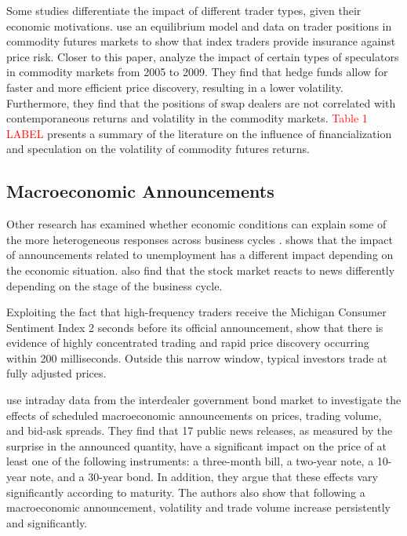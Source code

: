 \documentclass[12pt]{article}
\begin{document}
 Some studies differentiate the impact of different trader types, given their economic motivations. \citet{brunetti2014commodity}  use an equilibrium model and data on trader positions in commodity futures markets to show that index traders provide insurance against price risk.   Closer to this paper,\citet{brunetti2016speculators}  analyze the impact of certain types of speculators in commodity markets from 2005 to 2009. They find that hedge funds allow for faster and more efficient price discovery, resulting in a lower volatility. Furthermore, they find that the positions of swap dealers are not correlated with contemporaneous returns and volatility in the commodity markets.  \textcolor{red}{Table 1 LABEL} presents a summary of the literature on the influence of financialization and speculation on the volatility of commodity futures returns.

\subsection{Macroeconomic Announcements}

Other research has examined whether economic conditions can explain some of the more heterogeneous responses across business cycles \citep{boyd2005stock,andersen2003micro}. \citet{boyd2005stock} shows that the impact of announcements related to unemployment has a different impact depending on the economic situation. \citet{andersen2003micro} also find that the stock market reacts to news differently depending on the stage of the business cycle.

Exploiting the fact that high-frequency traders receive the Michigan Consumer Sentiment Index 2 seconds before its official announcement, \citet{hu2017early} show that there is evidence of highly concentrated trading and rapid price discovery occurring within 200 milliseconds. Outside this narrow window, typical investors trade at fully adjusted prices. 

\citet{balduzzi2001economic}  use intraday data from the interdealer government bond market to investigate the effects of scheduled macroeconomic announcements on prices, trading volume, and bid-ask spreads. They find that 17 public news releases, as measured by the surprise in the announced quantity, have a significant impact on the price of at least one of the following instruments: a three-month bill, a two-year note, a 10-year note, and a 30-year bond. In addition, they argue that these effects vary significantly according to maturity. The authors also show that following a macroeconomic announcement, volatility and trade volume increase persistently and significantly.
\end{document}
